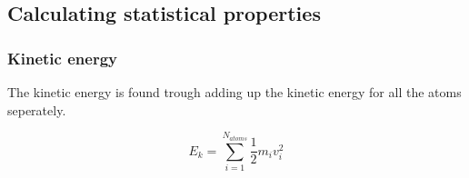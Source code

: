\documentclass[11pt]{article}
\begin{document}
	\subsection{Calculating statistical properties}
		\subsubsection{Kinetic energy}

		The kinetic energy is found trough adding up the kinetic energy for all the atoms seperately.

		\[
		E_k = \sum\limits^{N_{atoms}}_{i=1}{\frac{1}{2}m_i v_i^2}
		\]







	



{}

		
\end{document}
